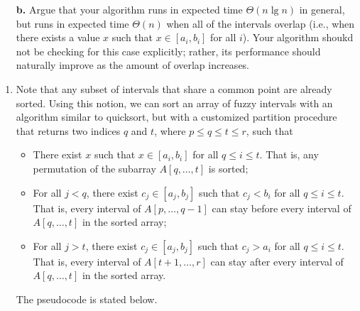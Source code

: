 \begin{enumerate}
{\begin{enumerate}
\item[\textbf{b.}]{Argue that your algorithm runs in expected time
$\Theta(n \lg n)$ in general, but runs in expected time $\Theta(n)$ when all of
the intervals overlap (i.e., when there exists a value $x$ such that
$x \in [a_i, b_i]$ for all $i$). Your algorithm shoukd not be checking for this
case explicitly; rather, its performance should naturally improve as the amount
of overlap increases.}
\end{enumerate}
}

\begin{framed}
\begin{enumerate}
\item{
Note that any subset of intervals that share a common point are already sorted.
Using this notion, we can sort an array of fuzzy intervals with an algorithm
similar to quicksort, but with a customized partition procedure that returns two
indices $q$ and $t$, where $p \le q \le t \le r$, such that
\begin{itemize}
\item There exist $x$ such that $x \in [a_i, b_i]$ for all $q \le i \le t$. That
is, any permutation of the subarray $A[q, \dots, t]$ is sorted;
\item For all $j < q$, there exist $c_j \in [a_j, b_j]$ such that $c_j < b_i$
for all $q \le i \le t$. That is, every interval of $A[p, \dots, q - 1]$ can
stay before every interval of $A[q, \dots, t]$ in the sorted array;
\item For all $j > t$, there exist $c_j \in [a_j, b_j]$ such that $c_j > a_i$
for all $q \le i \le t$. That is, every interval of $A[t + 1, \dots, r]$ can
stay after every interval of $A[q, \dots, t]$ in the sorted array.
\end{itemize}

The pseudocode is stated below.

\begin{algorithm}[H]
\SetAlgoNoEnd\DontPrintSemicolon
\BlankLine
{}
\nonl{}
\end{algorithm}

}
\end{enumerate}
\end{framed}
\end{enumerate}
